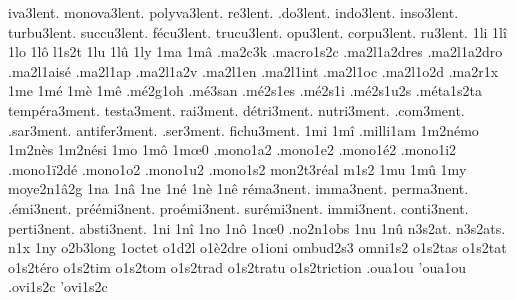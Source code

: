{     iva3lent.
  monova3lent.
  polyva3lent.
      re3lent.
     .do3lent.
    indo3lent.
    inso3lent.
   turbu3lent.
   succu3lent.
  f\'ecu3lent.
   trucu3lent.
     opu3lent.
   corpu3lent.
      ru3lent.
1li
1l\^i
1lo
1l\^o
l1s2t
1lu
1l\^u
1ly
1ma
1m\^a
                    .ma2c3k
                    .macro1s2c
                    .ma2l1a2dres
                    .ma2l1a2dro
                    .ma2l1ais\'e
                    .ma2l1ap
                    .ma2l1a2v
                    .ma2l1en
                    .ma2l1int
                    .ma2l1oc
                    .ma2l1o2d
                    .ma2r1x %
1me
1m\'e
1m\`e
1m\^e
                    .m\'e2g1oh
                    .m\'e3san %
                    .m\'e2s1es
                    .m\'e2s1i
                    .m\'e2s1u2s
                    .m\'eta1s2ta
temp\'era3ment.
    testa3ment.
      rai3ment.
  d\'etri3ment.
    nutri3ment.
     .com3ment.
     .sar3ment.
  antifer3ment.
     .ser3ment.
    fichu3ment.
1mi
1m\^i
                    .milli1am
                    1m2n\'emo
                    1m2n\`es
                    1m2n\'esi
1mo
1m\^o
1m\oe0 %
                    .mono1a2
                    .mono1e2
                    .mono1\'e2
                    .mono1i2
                    .mono1\"i2d\'e
                    .mono1o2
                    .mono1u2
                    .mono1s2
                    mon2t3r\'eal %
m1s2
1mu
1m\^u
1my
                    moye2n1\^a2g
1na
1n\^a
1ne
1n\'e
1n\`e
1n\^e
    r\'ema3nent.
      imma3nent.
     perma3nent.
    .\'emi3nent.
pr\'e\'emi3nent.
  pro\'emi3nent.
  sur\'emi3nent.
      immi3nent.
     conti3nent.
     perti3nent.
     absti3nent.
1ni
1n\^i
1no
1n\^o
1n\oe0 %
                    .no2n1obs
1nu
1n\^u
                    n3s2at.
                    n3s2ats.
n1x
1ny
                    o2b3long
                    1octet %
                    o1d2l
                    o1\`e2dre
                    o1ioni
                    ombud2s3
                    omni1s2
                    o1s2tas
                    o1s2tat
                    o1s2t\'ero
                    o1s2tim
                    o1s2tom
                    o1s2trad
                    o1s2tratu
                    o1s2triction
                    .oua1ou
                    'oua1ou
                    .ovi1s2c
                    'ovi1s2c
}

